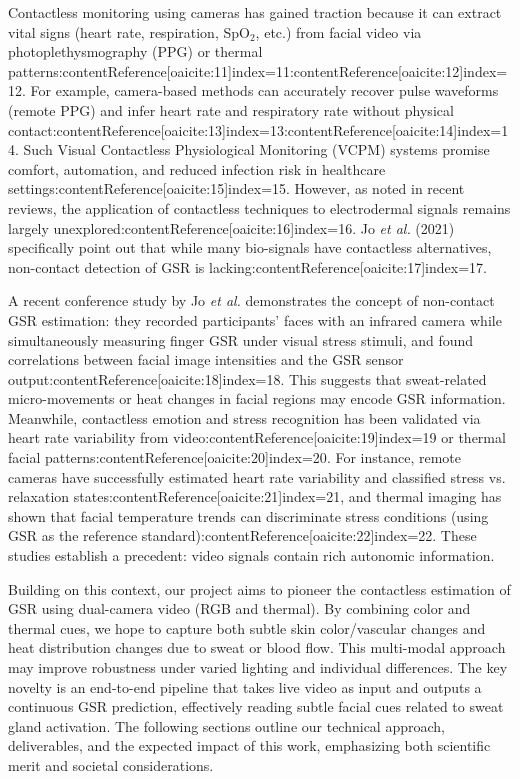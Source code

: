 \documentclass[12pt]{article}
\begin{document}
    Contactless monitoring using cameras has gained traction because it can extract vital signs (heart rate, respiration, SpO$_2$, etc.) from facial video via photoplethysmography (PPG) or thermal patterns:contentReference[oaicite:11]{index=11}:contentReference[oaicite:12]{index=12}. For example, camera-based methods can accurately recover pulse waveforms (remote PPG) and infer heart rate and respiratory rate without physical contact:contentReference[oaicite:13]{index=13}:contentReference[oaicite:14]{index=14}. Such Visual Contactless Physiological Monitoring (VCPM) systems promise comfort, automation, and reduced infection risk in healthcare settings:contentReference[oaicite:15]{index=15}. However, as noted in recent reviews, the application of contactless techniques to electrodermal signals remains largely unexplored:contentReference[oaicite:16]{index=16}. Jo \emph{et al.} (2021) specifically point out that while many bio-signals have contactless alternatives, non-contact detection of GSR is lacking:contentReference[oaicite:17]{index=17}.

    A recent conference study by Jo \emph{et al.} demonstrates the concept of non-contact GSR estimation: they recorded participants’ faces with an infrared camera while simultaneously measuring finger GSR under visual stress stimuli, and found correlations between facial image intensities and the GSR sensor output:contentReference[oaicite:18]{index=18}. This suggests that sweat-related micro-movements or heat changes in facial regions may encode GSR information. Meanwhile, contactless emotion and stress recognition has been validated via heart rate variability from video:contentReference[oaicite:19]{index=19} or thermal facial patterns:contentReference[oaicite:20]{index=20}. For instance, remote cameras have successfully estimated heart rate variability and classified stress vs. relaxation states:contentReference[oaicite:21]{index=21}, and thermal imaging has shown that facial temperature trends can discriminate stress conditions (using GSR as the reference standard):contentReference[oaicite:22]{index=22}. These studies establish a precedent: video signals contain rich autonomic information.

    Building on this context, our project aims to pioneer the contactless estimation of GSR using dual-camera video (RGB and thermal). By combining color and thermal cues, we hope to capture both subtle skin color/vascular changes and heat distribution changes due to sweat or blood flow. This multi-modal approach may improve robustness under varied lighting and individual differences. The key novelty is an end-to-end pipeline that takes live video as input and outputs a continuous GSR prediction, effectively reading subtle facial cues related to sweat gland activation. The following sections outline our technical approach, deliverables, and the expected impact of this work, emphasizing both scientific merit and societal considerations.
\end{document}
